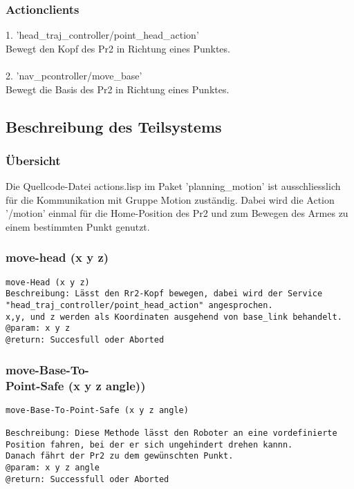 \documentclass{suturo}
\begin{document}
\subsubsection{Actionclients}
1. 'head\_traj\_controller/point\_head\_action' \\
Bewegt den Kopf des Pr2 in Richtung eines Punktes.\\ \\
2. 'nav\_pcontroller/move\_base' \\
Bewegt die Basis des Pr2 in Richtung eines Punktes.
\subsection{Beschreibung des Teilsystems}

\subsubsection{\"Ubersicht}
Die Quellcode-Datei actions.lisp im Paket 'planning\_motion'  ist ausschliesslich für die Kommunikation mit Gruppe Motion zuständig. Dabei wird die Action '/motion' einmal für die Home-Position des Pr2 und zum Bewegen des Armes zu einem bestimmten Punkt genutzt.



\subsubsection{move-head (x y z)}

\begin{verbatim}
move-Head (x y z)
Beschreibung: Lässt den Rr2-Kopf bewegen, dabei wird der Service 
"head_traj_controller/point_head_action" angesprochen.
x,y, und z werden als Koordinaten ausgehend von base_link behandelt.
@param: x y z
@return: Succesfull oder Aborted
\end{verbatim}


\subsubsection{move-Base-To-\\
Point-Safe (x y z angle))
}
\begin{verbatim}
move-Base-To-Point-Safe (x y z angle)

Beschreibung: Diese Methode lässt den Roboter an eine vordefinierte 
Position fahren, bei der er sich ungehindert drehen kannn.
Danach fährt der Pr2 zu dem gewünschten Punkt.
@param: x y z angle
@return: Successfull oder Aborted
\end{verbatim}
\end{document}
